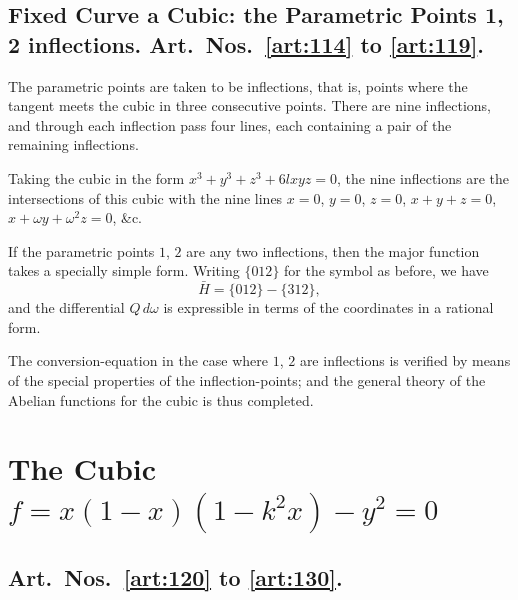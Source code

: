 \documentclass[11pt,a4paper]{book}
\begin{document}
\newpage
\subsection*{Fixed Curve a Cubic: the Parametric Points 1, 2 inflections. Art.~Nos.~\ref{art:114} to \ref{art:119}.}

\begin{art}\label{art:114}
The parametric points are taken to be inflections, that is, points where the tangent meets the cubic in three consecutive points. There are nine inflections, and through each inflection pass four lines, each containing a pair of the remaining inflections.

Taking the cubic in the form $x^3 + y^3 + z^3 + 6lxyz = 0$, the nine inflections are the intersections of this cubic with the nine lines $x = 0$, $y = 0$, $z = 0$, $x + y + z = 0$, $x + \omega y + \omega^2 z = 0$, \&c.
\end{art}

\begin{art}\label{art:115}
If the parametric points $1$, $2$ are any two inflections, then the major function takes a specially simple form. Writing $\{012\}$ for the symbol as before, we have
\[
\bar{H} = \{012\} - \{312\},
\]
and the differential $Q\,d\omega$ is expressible in terms of the coordinates in a rational form.
\end{art}

\begin{art}\label{art:116}
The conversion-equation in the case where $1$, $2$ are inflections is verified by means of the special properties of the inflection-points; and the general theory of the Abelian functions for the cubic is thus completed.
\end{art}

\newpage
\section*{The Cubic $f = x(1-x)(1 - k^2 x) - y^2 = 0$}

\subsection*{Art.~Nos.~\ref{art:120} to \ref{art:130}.}
\end{document}
